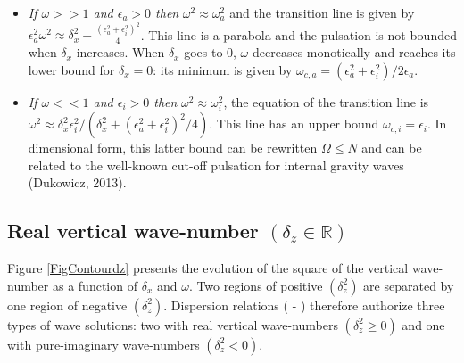 \documentclass[a4paper,11pt]{article}
\begin{document}
\begin{itemize}
	\item \textit{If $\omega>>1$ and $\epsilon_a>0$ then} $\omega^2\approx\omega_a^2$ and the transition line is given by 
	$\epsilon_a^2\omega^2 \approx
	\delta_x^2
 	+\frac{(\epsilon_a^2+\epsilon_i^2)^2}{4}$. This line is a parabola and the pulsation is not bounded when $\delta_x$ increases. 
 	When $\delta_x$ goes to 0, $\omega$ decreases monotically and reaches its lower bound for $\delta_x=0$: its minimum is given by $\omega_{c,a}=(\epsilon_a^2+\epsilon_i^2)/2\epsilon_a$.
	\item \textit{If $\omega<<1$ and $\epsilon_i>0$ then} $\omega^2\approx\omega_i^2$, the equation of the transition line is $\omega^2\approx\delta_x^2\epsilon_i^2/(\delta_x^2+(\epsilon_a^2+\epsilon_i^2)^2/4)$. This line has an upper bound $\omega_{c,i}=\epsilon_i$.
	In dimensional form, this latter bound can be rewritten $\Omega\leq N$ and can be related to the well-known cut-off pulsation for internal gravity waves (Dukowicz, 2013).
\end{itemize}

\subsection{Real vertical wave-number $(\delta_z\in\mathbb{R})$}
Figure \ref{FigContourdz} presents the evolution of the square of the vertical wave-number as a function of $\delta_x$ and $\omega$. Two regions of positive $(\delta_z^2)$ are separated by one region of negative $(\delta_z^2)$. Dispersion relations ( - ) therefore authorize three types of wave solutions: two with real vertical wave-numbers $(\delta_z^2\geq0)$ and one with pure-imaginary wave-numbers $(\delta_z^2<0)$. \\
\end{document}
